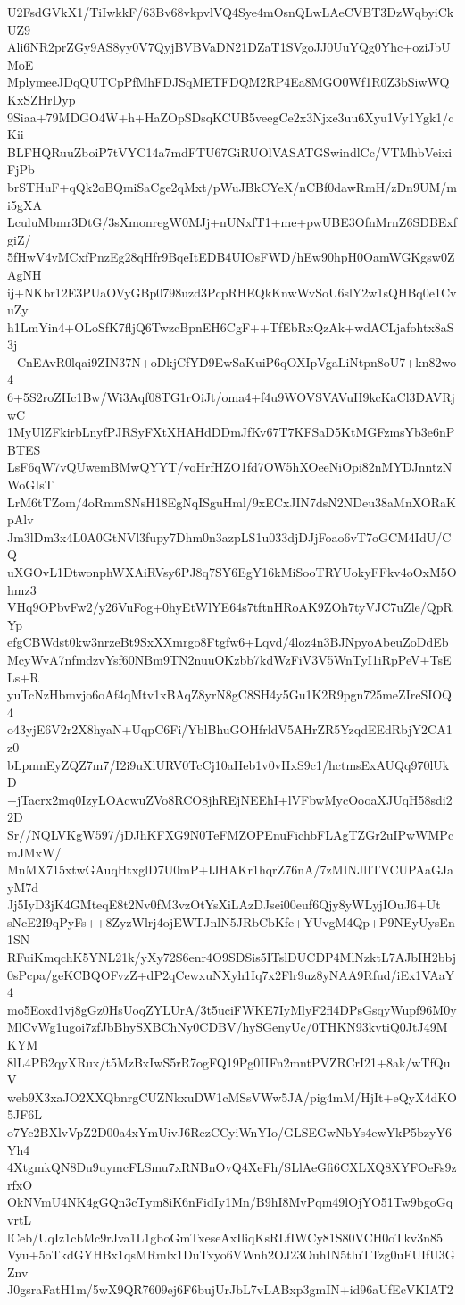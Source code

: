 U2FsdGVkX1/TiIwkkF/63Bv68vkpvlVQ4Sye4mOsnQLwLAeCVBT3DzWqbyiCkUZ9
Ali6NR2prZGy9AS8yy0V7QyjBVBVaDN21DZaT1SVgoJJ0UuYQg0Yhc+oziJbUMoE
MplymeeJDqQUTCpPfMhFDJSqMETFDQM2RP4Ea8MGO0Wf1R0Z3bSiwWQKxSZHrDyp
9Siaa+79MDGO4W+h+HaZOpSDsqKCUB5veegCe2x3Njxe3uu6Xyu1Vy1Ygk1/cKii
BLFHQRuuZboiP7tVYC14a7mdFTU67GiRUOlVASATGSwindlCc/VTMhbVeixiFjPb
brSTHuF+qQk2oBQmiSaCge2qMxt/pWuJBkCYeX/nCBf0dawRmH/zDn9UM/mi5gXA
LculuMbmr3DtG/3sXmonregW0MJj+nUNxfT1+me+pwUBE3OfnMrnZ6SDBExfgiZ/
5fHwV4vMCxfPnzEg28qHfr9BqeItEDB4UIOsFWD/hEw90hpH0OamWGKgsw0ZAgNH
ij+NKbr12E3PUaOVyGBp0798uzd3PcpRHEQkKnwWvSoU6slY2w1sQHBq0e1CvuZy
h1LmYin4+OLoSfK7fljQ6TwzcBpnEH6CgF++TfEbRxQzAk+wdACLjafohtx8aS3j
+CnEAvR0lqai9ZIN37N+oDkjCfYD9EwSaKuiP6qOXIpVgaLiNtpn8oU7+kn82wo4
6+5S2roZHc1Bw/Wi3Aqf08TG1rOiJt/oma4+f4u9WOVSVAVuH9kcKaCl3DAVRjwC
1MyUlZFkirbLnyfPJRSyFXtXHAHdDDmJfKv67T7KFSaD5KtMGFzmsYb3e6nPBTES
LsF6qW7vQUwemBMwQYYT/voHrfHZO1fd7OW5hXOeeNiOpi82nMYDJnntzNWoGIsT
LrM6tTZom/4oRmmSNsH18EgNqISguHml/9xECxJIN7dsN2NDeu38aMnXORaKpAlv
Jm3lDm3x4L0A0GtNVl3fupy7Dhm0n3azpLS1u033djDJjFoao6vT7oGCM4IdU/CQ
uXGOvL1DtwonphWXAiRVsy6PJ8q7SY6EgY16kMiSooTRYUokyFFkv4oOxM5Ohmz3
VHq9OPbvFw2/y26VuFog+0hyEtWlYE64s7tftnHRoAK9ZOh7tyVJC7uZle/QpRYp
efgCBWdst0kw3nrzeBt9SxXXmrgo8Ftgfw6+Lqvd/4loz4n3BJNpyoAbeuZoDdEb
McyWvA7nfmdzvYsf60NBm9TN2nuuOKzbb7kdWzFiV3V5WnTyI1iRpPeV+TsELs+R
yuTcNzHbmvjo6oAf4qMtv1xBAqZ8yrN8gC8SH4y5Gu1K2R9pgn725meZIreSIOQ4
o43yjE6V2r2X8hyaN+UqpC6Fi/YblBhuGOHfrldV5AHrZR5YzqdEEdRbjY2CA1z0
bLpmnEyZQZ7m7/I2i9uXlURV0TcCj10aHeb1v0vHxS9c1/hctmsExAUQq970lUkD
+jTacrx2mq0IzyLOAcwuZVo8RCO8jhREjNEEhI+lVFbwMycOooaXJUqH58sdi22D
Sr//NQLVKgW597/jDJhKFXG9N0TeFMZOPEnuFichbFLAgTZGr2uIPwWMPcmJMxW/
MnMX715xtwGAuqHtxglD7U0mP+IJHAKr1hqrZ76nA/7zMINJlITVCUPAaGJayM7d
Jj5IyD3jK4GMteqE8t2Nv0fM3vzOtYsXiLAzDJsei00euf6Qjy8yWLyjIOuJ6+Ut
sNcE2I9qPyFs++8ZyzWlrj4ojEWTJnlN5JRbCbKfe+YUvgM4Qp+P9NEyUysEn1SN
RFuiKmqchK5YNL21k/yXy72S6enr4O9SDSis5ITslDUCDP4MlNzktL7AJbIH2bbj
0sPcpa/geKCBQOFvzZ+dP2qCewxuNXyh1Iq7x2Flr9uz8yNAA9Rfud/iEx1VAaY4
mo5Eoxd1vj8gGz0HsUoqZYLUrA/3t5uciFWKE7IyMlyF2fl4DPsGsqyWupf96M0y
MlCvWg1ugoi7zfJbBhySXBChNy0CDBV/hySGenyUc/0THKN93kvtiQ0JtJ49MKYM
8lL4PB2qyXRux/t5MzBxIwS5rR7ogFQ19Pg0IIFn2mntPVZRCrI21+8ak/wTfQuV
web9X3xaJO2XXQbnrgCUZNkxuDW1cMSsVWw5JA/pig4mM/HjIt+eQyX4dKO5JF6L
o7Yc2BXlvVpZ2D00a4xYmUivJ6RezCCyiWnYIo/GLSEGwNbYs4ewYkP5bzyY6Yh4
4XtgmkQN8Du9uymcFLSmu7xRNBnOvQ4XeFh/SLlAeGfi6CXLXQ8XYFOeFs9zrfxO
OkNVmU4NK4gGQn3cTym8iK6nFidIy1Mn/B9hI8MvPqm49lOjYO51Tw9bgoGqvrtL
lCeb/UqIz1cbMc9rJva1L1gboGmTxeseAxIliqKsRLfIWCy81S80VCH0oTkv3n85
Vyu+5oTkdGYHBx1qsMRmlx1DuTxyo6VWnh2OJ23OuhIN5tluTTzg0uFUIfU3GZnv
J0gsraFatH1m/5wX9QR7609ej6F6bujUrJbL7vLABxp3gmIN+id96aUfEcVKIAT2
